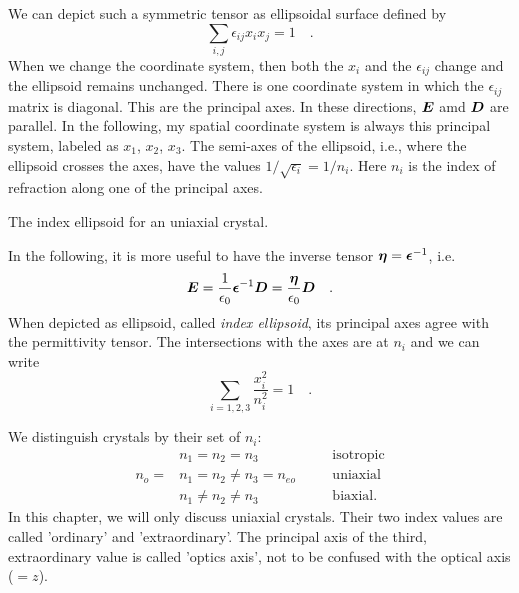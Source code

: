 We can depict such a symmetric tensor as ellipsoidal surface defined by 
\begin{equation}
     \sum_{i,j} \epsilon_{i j}  x_i x_j = 1 \quad .
\end{equation}
When we change the coordinate system, then both the $x_i$ and the $\epsilon_{ij}$ change and the ellipsoid remains unchanged. There is one coordinate system in which the $\epsilon_{ij}$ matrix is diagonal. This are the principal axes.  In these directions, $\boldsymbol{E}$ amd $\boldsymbol{D}$ are parallel. In the following, my spatial coordinate system is always this principal system, labeled as $x_1$, $x_2$, $x_3$. The semi-axes of the ellipsoid, i.e., where the ellipsoid crosses the axes, have the values $1/\sqrt{\epsilon_i} = 1/n_i$. Here $n_i$ is the index of refraction along one of the principal axes.


\begin{marginfigure}
    \caption{The index ellipsoid for an uniaxial crystal.}
\end{marginfigure}


In the following, it is more useful to have the inverse tensor $\boldsymbol{\eta} = \boldsymbol{\epsilon}^{-1}$, i.e.
\begin{equation}
    \boldsymbol{E} = \frac{1}{\epsilon_0} \boldsymbol{\epsilon}^{-1} \boldsymbol{D}  = \frac{\boldsymbol{\eta}}{\epsilon_0}  \boldsymbol{D} \quad .
 \end{equation}
When depicted as ellipsoid, called \emph{index ellipsoid}, its principal axes agree with the permittivity tensor. The intersections with the axes are at $n_i$ and we can write
\begin{equation}
    \sum_{i=1,2,3} \frac{x_i^2}{n_i^2} = 1 \quad .
\end{equation}



We distinguish crystals by their set of $n_i$:
\begin{align}
          &  n_1 = n_2 = n_3             & & \quad \text{isotropic} \\
 n_{o} = &  n_1 = n_2  \neq n_3  =n_{eo} && \quad \text{uniaxial} \\
           &   n_1 \neq n_2  \neq n_3      & & \quad \text{biaxial.} 
\end{align}
In this chapter, we will only discuss  uniaxial crystals. Their two index values are called 'ordinary' and 'extraordinary'. The principal axis of the third, extraordinary value is called 'optics axis', not to be confused with the optical axis ($=z$).



